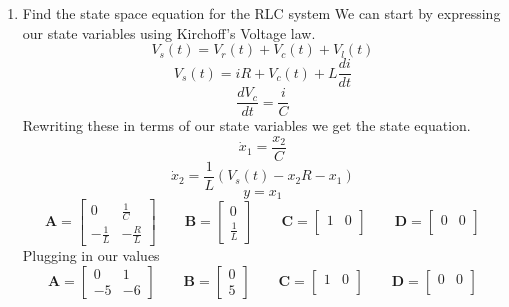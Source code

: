 \documentclass{article}
\begin{document}
\begin{enumerate}[1)]
\item Find the state space equation for the RLC system
\newline
We can start by expressing our state variables using Kirchoff's Voltage law.
$$ V_s(t) = V_r(t) + V_c(t) + V_l(t) $$
$$ V_s(t) = iR + V_c(t) + L\frac{di}{dt} $$
$$ \frac{dV_c}{dt} = \frac{i}{C}  $$
Rewriting these in terms of our state variables we get the state equation.
$$ \dot{x}_1 = \frac{x_2}{C} $$
$$ \dot{x}_2 = \frac{1}{L}(V_s(t) - x_2R - x_1) $$
$$ y = x_1$$
$$
\mathbf{A}
=
\begin{bmatrix}
 0 &  \frac{1}{C} \\
 -\frac{1}{L} & -\frac{R}{L}
\end{bmatrix}
\qquad
\mathbf{B}
=
\begin{bmatrix}
 0  \\
\frac{1}{L}
\end{bmatrix}
\qquad
\mathbf{C}
=
\begin{bmatrix}
 1 & 0 \\
\end{bmatrix}
\qquad
\mathbf{D}
=
\begin{bmatrix}
 0 & 0 \\
\end{bmatrix}
$$
Plugging in our values
$$
\mathbf{A}
=
\begin{bmatrix}
 0 &  1 \\
 -5 & -6
\end{bmatrix}
\qquad
\mathbf{B}
=
\begin{bmatrix}
 0  \\
 5
\end{bmatrix}
\qquad
\mathbf{C}
=
\begin{bmatrix}
 1 & 0 \\
\end{bmatrix}
\qquad
\mathbf{D}
=
\begin{bmatrix}
 0 & 0 \\
\end{bmatrix}
$$



\end{enumerate}
\end{document}
